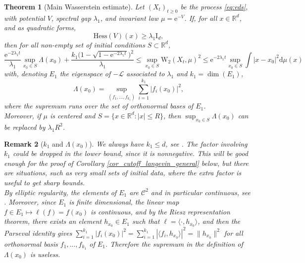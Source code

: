 \documentclass[10pt,reqno]{amsart}
\newtheorem{theorem}{Theorem}[section]
\newtheorem{remark}[theorem]{Remark}
\numberwithin{equation}{section}
\begin{document}
\begin{theorem}[Main Wasserstein estimate]\label{th:maineucl}
  Let ${(X_t)}_{t\geq0}$ be the process \eqref{eq:eds}, with potential $V$,
  spectral gap $\lambda_1$, and invariant law $\mu=\mathrm{e}^{-V}$. If, for
  all $x\in\mathbb{R}^d$, and as quadratic forms,
  \begin{equation}\label{eq:curgap}
    \mathrm{Hess}(V)(x) \geq \lambda_1\mathrm{I}_d,
  \end{equation}
  then for all non-empty set of initial conditions $S\subset\mathbb{R}^d$,
  \begin{equation}\label{eq:maineucl}
    \frac{\mathrm{e}^{-2\lambda_1 t}}{\lambda_1}\sup_{x_0 \in
        S}\Lambda(x_0)%
       +\frac{k_1\bigl(1-\sqrt{1-\mathrm{e}^{-2\lambda_1 t}}\bigr)^2}{\lambda_1}
    \leq\sup_{x_0\in S}\mathrm{W}_2(X_t, \mu)^2
	  \leq \mathrm{e}^{-2\lambda_1 t} \sup_{x_0 \in S}\int|x-x_0|^2\mathrm{d}\mu(x)
  \end{equation}
  with, denoting $E_1$ the eigenspace of $-\mathcal{L}$ associated to
  $\lambda_1$ and $k_1=\dim(E_1)$,
  \begin{equation}
    \Lambda(x_0)
    =\sup_{(f_1,\ldots,f_{k_1})}\sum_{i=1}^{k_1}|f_i(x_0)|^2,
  \end{equation}
  where the supremum runs over the set of orthonormal bases of $E_1$.\\
  Moreover, if $\mu$ is centered and $S=\{x\in\mathbb{R}^d:|x|\leq R\}$, then
  $\displaystyle\sup_{x_0 \in S}\Lambda(x_0)$ can be replaced by
  $\lambda_1R^2$.
\end{theorem}

\begin{remark}[$k_1$ and $\Lambda(x_0)$]
  We always have $k_1 \leq d$, see \cite[Lem.~14]{BaKl20}. The factor involving $k_1$ could be dropped in the lower bound, since it is nonnegative. This will be good enough for the proof of Corollary \ref{cor_cutoff_langevin_general} below, but there are situations, such as very small sets of initial data, where the extra factor is useful to get sharp bounds.\\
  By elliptic regularity, the elements of $E_1$ are $\mathcal{C}^2$ and in particular continuous, see \cite[Ch.~6]{Evans10}.
  Moreover, since $E_1$ is finite dimensional, the linear map
  $f\in E_1\mapsto\ell(f)=f(x_0)$ is continuous, and by the Riesz
  representation theorem, there exists an element $h_{x_0}\in E_1$ such that
  $\ell=\langle \cdot,h_{x_0}\rangle$, and then the Parseval identity gives
  $\sum_{i=1}^{k_1}|f_i(x_0)|^2=\sum_{i=1}^{k_1}|\langle
  f_i,h_{x_0}\rangle|^2=\|h_{x_0}\|^2$ for all orthonormal basis
  $f_1,\ldots,f_{k_1}$ of $E_1$. Therefore the supremum in the definition of
  $\Lambda(x_0)$ is useless.
\end{remark}
\end{document}
